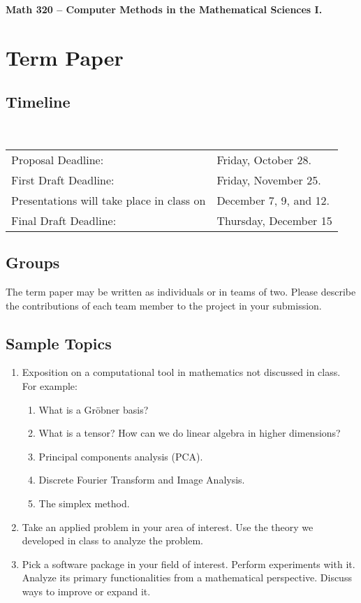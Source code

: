 \documentclass[12pt]{amsart}
\begin{document}
{\bf Math 320 -- Computer Methods in the Mathematical Sciences I.}\\
\section*{Term Paper}

\subsection*{Timeline} \hspace{1cm} \\[3mm]
\begin{tabular}{p{3in}l}
Proposal Deadline:&  Friday, October 28. \\

First Draft Deadline:& Friday, November 25. \\

Presentations will take place in class on &  December 7, 9, and 12. \\

Final Draft Deadline:& Thursday, December 15 \\
\end{tabular}

\subsection*{Groups}
The term paper may be written as individuals or in teams
of two. Please describe the contributions of each team member
to the project in your submission.

\subsection*{Sample Topics}

\begin{enumerate}

\item Exposition on a computational tool in mathematics not
discussed in class. For example:
\begin{enumerate}
\item What is a Gr\"{o}bner basis?
\item What is a tensor? How can we do linear algebra in higher dimensions?
\item Principal components analysis (PCA).
\item Discrete Fourier Transform and Image Analysis.
\item The simplex method.
\end{enumerate}

\item Take an applied problem in your area of interest.
Use the theory we developed in class to analyze the problem.

\item Pick a software package in your field of interest. Perform
experiments with it. Analyze its primary functionalities from 
a mathematical perspective. Discuss ways to improve or expand it.


\end{enumerate}
\end{document}
